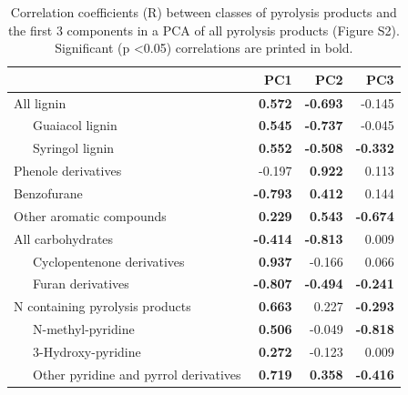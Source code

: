 \documentclass[10pt]{article}
\begin{document}
\begin{flushleft}
\newpage

%





%


\begin{table}[h!]
\centering
\caption{Correlation coefficients (R) between classes of pyrolysis products and the first 3 components in a PCA of all pyrolysis products (Figure S2). Significant (p \textless 0.05) correlations are printed in bold.} 
\label{cor_pyrpca}
{\small
\begin{tabular}{lrrr}
  \hline
 & PC1 & PC2 & PC3 \\ 
  \hline
All lignin & \textbf{ 0.572 } & \textbf{ -0.693 } & -0.145 \\ 
  \ \ \ Guaiacol lignin & \textbf{ 0.545 } & \textbf{ -0.737 } & -0.045 \\ 
  \ \ \ Syringol lignin & \textbf{ 0.552 } & \textbf{ -0.508 } & \textbf{ -0.332 } \\ 
  Phenole derivatives & -0.197 & \textbf{ 0.922 } & 0.113 \\ 
  Benzofurane & \textbf{ -0.793 } & \textbf{ 0.412 } & 0.144 \\ 
  Other aromatic compounds & \textbf{ 0.229 } & \textbf{ 0.543 } & \textbf{ -0.674 } \\ 
  All carbohydrates & \textbf{ -0.414 } & \textbf{ -0.813 } & 0.009 \\ 
  \ \ \ Cyclopentenone derivatives & \textbf{ 0.937 } & -0.166 & 0.066 \\ 
  \ \ \ Furan derivatives & \textbf{ -0.807 } & \textbf{ -0.494 } & \textbf{ -0.241 } \\ 
  N containing pyrolysis products & \textbf{ 0.663 } & 0.227 & \textbf{ -0.293 } \\ 
  \ \ \ N-methyl-pyridine & \textbf{ 0.506 } & -0.049 & \textbf{ -0.818 } \\ 
  \ \ \ 3-Hydroxy-pyridine & \textbf{ 0.272 } & -0.123 & 0.009 \\ 
  \ \ \ Other pyridine and pyrrol derivatives & \textbf{ 0.719 } & \textbf{ 0.358 } & \textbf{ -0.416 } \\ 

\end{tabular}}
\end{table}
\end{flushleft}
\end{document}
